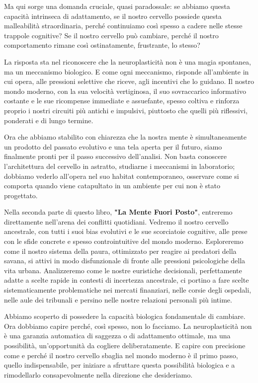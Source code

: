 Ma qui sorge una domanda cruciale, quasi paradossale: se abbiamo questa capacità intrinseca di adattamento, se il nostro cervello possiede questa malleabilità straordinaria, perché continuiamo così spesso a cadere nelle stesse trappole cognitive? Se il nostro cervello può cambiare, perché il nostro comportamento rimane così ostinatamente, frustrante, lo stesso?

La risposta sta nel riconoscere che la neuroplasticità non è una magia spontanea, ma un meccanismo biologico. E come ogni meccanismo, risponde all'ambiente in cui opera, alle pressioni selettive che riceve, agli incentivi che lo guidano. Il nostro mondo moderno, con la sua velocità vertiginosa, il suo sovraccarico informativo costante e le sue ricompense immediate e assuefante, spesso coltiva e rinforza proprio i nostri circuiti più antichi e impulsivi, piuttosto che quelli più riflessivi, ponderati e di lungo termine.

Ora che abbiamo stabilito con chiarezza che la nostra mente è simultaneamente un prodotto del passato evolutivo e una tela aperta per il futuro, siamo finalmente pronti per il passo successivo dell'analisi. Non basta conoscere l'architettura del cervello in astratto, studiarne i meccanismi in laboratorio; dobbiamo vederlo all'opera nel suo habitat contemporaneo, osservare come si comporta quando viene catapultato in un ambiente per cui non è stato progettato.

Nella seconda parte di questo libro, \textbf{"La Mente Fuori Posto"}, entreremo direttamente nell'arena dei conflitti quotidiani. Vedremo il nostro cervello ancestrale, con tutti i suoi bias evolutivi e le sue scorciatoie cognitive, alle prese con le sfide concrete e spesso controintuitive del mondo moderno. Esploreremo come il nostro sistema della paura, ottimizzato per reagire ai predatori della savana, si attivi in modo disfunzionale di fronte alle pressioni psicologiche della vita urbana. Analizzeremo come le nostre euristiche decisionali, perfettamente adatte a scelte rapide in contesti di incertezza ancestrale, ci portino a fare scelte sistematicamente problematiche nei mercati finanziari, nelle corsie degli ospedali, nelle aule dei tribunali e persino nelle nostre relazioni personali più intime.

Abbiamo scoperto di possedere la capacità biologica fondamentale di cambiare. Ora dobbiamo capire perché, così spesso, non lo facciamo. La neuroplasticità non è una garanzia automatica di saggezza o di adattamento ottimale, ma una possibilità, un'opportunità da cogliere deliberatamente. E capire con precisione come e perché il nostro cervello sbaglia nel mondo moderno è il primo passo, quello indispensabile, per iniziare a sfruttare questa possibilità biologica e a rimodellarlo consapevolmente nella direzione che desideriamo.